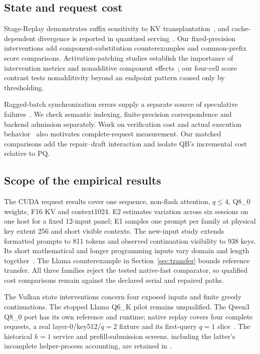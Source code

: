\subsection{State and request cost}
Stage-Replay demonstrates suffix sensitivity to KV transplantation~\cite{stagereplay}, and cache-dependent divergence is reported in quantized serving~\cite{cachestate}. Our fixed-precision interventions add component-substitution counterexamples and common-prefix score comparisons. Activation-patching studies establish the importance of intervention metrics and nonadditive component effects~\cite{patching,mediators}; our four-cell score contrast tests nonadditivity beyond an endpoint pattern caused only by thresholding.

Ragged-batch synchronization errors supply a separate source of speculative failures~\cite{forensics}. We check semantic indexing, finite-precision correspondence and backend admission separately. Work on verification cost and actual execution behavior~\cite{illusion,lossless} also motivates complete-request measurement. Our matched comparisons add the repair--draft interaction and isolate QB's incremental cost relative to PQ.

\subsection{Scope of the empirical results}
The CUDA request results cover one sequence, non-flash attention, $q\leq4$, Q8\_0 weights, F16 KV and context1024. E2 estimates variation across six sessions on one host for a fixed 12-input panel; E1 samples one prompt per family at physical key extent 256 and short visible contexts. The new-input study extends formatted prompts to 811 tokens and observed continuation visibility to 938 keys. Its short mathematical and longer programming inputs vary domain and length together~\cite{rtxtransferrecords}. The Llama counterexample in Section~\ref{sec:transfer} bounds reference transfer. All three families reject the tested native-fast comparator, so qualified cost comparisons remain against the declared serial and repaired paths.

The Vulkan state interventions concern four exposed inputs and finite greedy continuations. The stopped Llama Q6\_K pilot remains unqualified. The Qwen3 Q8\_0 port has its own reference and runtime; native replay covers four complete requests, a real layer-0/key512/$q=2$ fixture and its first-query $q=1$ slice~\cite{b570nativereproduction}. The historical $k=1$ service and prefill-submission screens, including the latter's incomplete helper-process accounting, are retained in .

